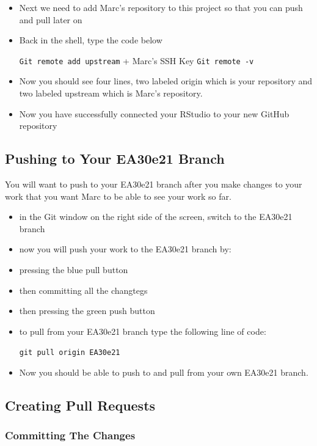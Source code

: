 \documentclass[12pt]{../SOP4_alpha}
\begin{document}
\begin{itemize}
    \item Next we need to add Marc's repository to this project so that you can push and pull later on
     

      \item Back in the shell, type the code below
        
        \indent\verb"Git remote add upstream" + Marc's SSH Key
        \indent\verb"Git remote -v"
       
      \item Now you should see four lines, two labeled origin which is your repository and two labeled upstream which is Marc’s repository. 
      \item Now you have successfully connected your RStudio to your new GitHub repository 
\end{itemize}


\subsection {Pushing to Your EA30e21 Branch}
You will want to push to your EA30e21 branch after you make changes to your work that you want Marc to be able to see your work so far. 

\begin{itemize}
  
  \item in the Git window on the right side of the screen, switch to the EA30e21 branch

\item now you will push your work to the EA30e21 branch by:
  \item pressing the blue pull button
  \item then committing all the changtegs
  \item then pressing the green push button
\item to pull from your EA30e21 branch type the following line of code:

  \ident\verb"git pull origin EA30e21"
\item Now you should be able to push to and pull from your own EA30e21 branch.

\end{itemize}


\subsection {Creating Pull Requests}


\subsubsection{Committing The Changes}
\end{document}
